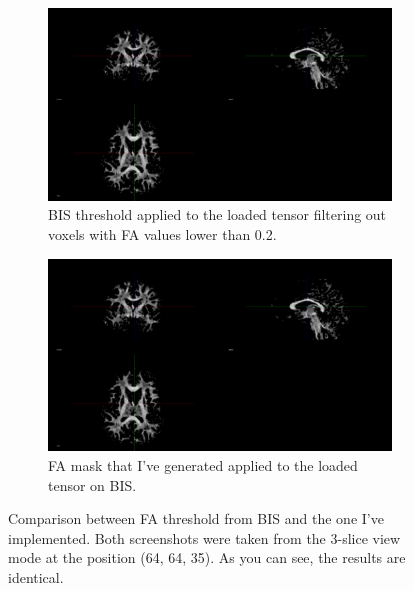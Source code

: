 \documentclass[a4paper,11pt]{report}
\begin{document}
  \begin{figure}[!ht]
    \centering

    \begin{subfigure}[t]{.49\textwidth}
      \includegraphics[width=1\linewidth]{img/bis_fa_threshold.png}
      \caption{BIS threshold applied to the loaded tensor filtering out voxels with FA values lower than 0.2.}
      \label{subfig:bis_fa_threshold}
    \end{subfigure}\hfill%
    \begin{subfigure}[t]{.49\textwidth}
      \includegraphics[width=1\linewidth]{img/my_fa_threshold.png}
      \caption{FA mask that I've generated applied to the loaded tensor on BIS.}
      \label{subfig:my_fa_threshold}
    \end{subfigure}

    \caption{Comparison between FA threshold from BIS and the one I've implemented. Both screenshots were taken from the 3-slice view mode at the position (64, 64, 35). As you can see, the results are identical.}
    \label{fig:bis-my-comparison}
  \end{figure}
\end{document}
